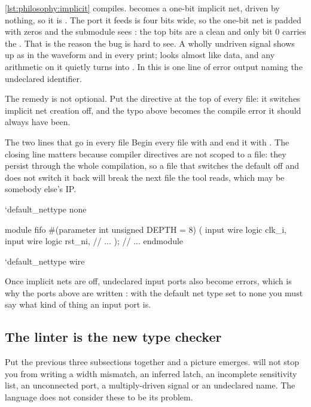 \cref{lst:philosophy:implicit} compiles.  becomes a one-bit
implicit net, driven by nothing, so it is . The port it feeds is four
bits wide, so the one-bit net is padded with zeros and the submodule sees
: the top bits are a clean  and only bit 0 carries the
. That is the reason the bug is hard to see. A wholly undriven signal
shows up as  in the waveform and in every print;  looks
almost like data, and any arithmetic on it quietly turns into . In
\VHDL{} this is one line of error output naming the undeclared identifier.

The remedy is not optional. Put the directive
 at the top of every file: it switches
implicit net creation off, and the typo above becomes the compile error it
should always have been.

\begin{tipbox}{The two lines that go in every file}
Begin every  file with  and end it
with . The closing line matters because
compiler directives are not scoped to a file: they persist through the whole
compilation, so a file that switches the default off and does not switch it
back will break the next file the tool reads, which may be somebody else's
IP.

\begin{svcode}
`default_nettype none

module fifo #(parameter int unsigned DEPTH = 8) (
  input  wire  logic clk_i,
  input  wire  logic rst_ni,
  // ...
);
  // ...
endmodule

`default_nettype wire
\end{svcode}
Once implicit nets are off, undeclared input ports also become errors, which is
why the ports above are written : with the default net
type set to none you must say what kind of thing an input port is.
\end{tipbox}

\subsection{The linter is the new type checker}

Put the previous three subsections together and
a picture emerges. \SV{} will not stop you from writing a width mismatch, an
inferred latch, an incomplete sensitivity list, an unconnected port, a
multiply-driven signal or an undeclared name. The language does not consider
these to be its problem.

